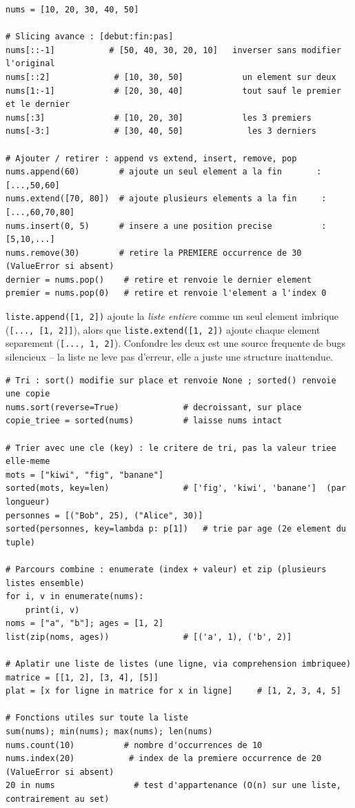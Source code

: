 \documentclass[11pt,a4paper]{article}
\begin{document}
\begin{lstlisting}
nums = [10, 20, 30, 40, 50]

# Slicing avance : [debut:fin:pas]
nums[::-1]           # [50, 40, 30, 20, 10]   inverser sans modifier l'original
nums[::2]             # [10, 30, 50]            un element sur deux
nums[1:-1]            # [20, 30, 40]            tout sauf le premier et le dernier
nums[:3]              # [10, 20, 30]            les 3 premiers
nums[-3:]             # [30, 40, 50]             les 3 derniers

# Ajouter / retirer : append vs extend, insert, remove, pop
nums.append(60)        # ajoute un seul element a la fin       : [...,50,60]
nums.extend([70, 80])  # ajoute plusieurs elements a la fin     : [...,60,70,80]
nums.insert(0, 5)      # insere a une position precise          : [5,10,...]
nums.remove(30)        # retire la PREMIERE occurrence de 30 (ValueError si absent)
dernier = nums.pop()    # retire et renvoie le dernier element
premier = nums.pop(0)   # retire et renvoie l'element a l'index 0

\end{lstlisting}

\begin{piege}
\texttt{liste.append([1, 2])} ajoute la \emph{liste entiere} comme un seul
element imbrique (\texttt{[..., [1, 2]]}), alors que
\texttt{liste.extend([1, 2])} ajoute chaque element separement
(\texttt{[..., 1, 2]}). Confondre les deux est une source frequente de bugs
silencieux -- la liste ne leve pas d'erreur, elle a juste une structure
inattendue.
\end{piege}

\begin{lstlisting}
# Tri : sort() modifie sur place et renvoie None ; sorted() renvoie une copie
nums.sort(reverse=True)             # decroissant, sur place
copie_triee = sorted(nums)          # laisse nums intact

# Trier avec une cle (key) : le critere de tri, pas la valeur triee elle-meme
mots = ["kiwi", "fig", "banane"]
sorted(mots, key=len)               # ['fig', 'kiwi', 'banane']  (par longueur)
personnes = [("Bob", 25), ("Alice", 30)]
sorted(personnes, key=lambda p: p[1])   # trie par age (2e element du tuple)

# Parcours combine : enumerate (index + valeur) et zip (plusieurs listes ensemble)
for i, v in enumerate(nums):
    print(i, v)
noms = ["a", "b"]; ages = [1, 2]
list(zip(noms, ages))               # [('a', 1), ('b', 2)]

# Aplatir une liste de listes (une ligne, via comprehension imbriquee)
matrice = [[1, 2], [3, 4], [5]]
plat = [x for ligne in matrice for x in ligne]     # [1, 2, 3, 4, 5]

# Fonctions utiles sur toute la liste
sum(nums); min(nums); max(nums); len(nums)
nums.count(10)          # nombre d'occurrences de 10
nums.index(20)           # index de la premiere occurrence de 20 (ValueError si absent)
20 in nums                # test d'appartenance (O(n) sur une liste, contrairement au set)
\end{lstlisting}
\end{document}
